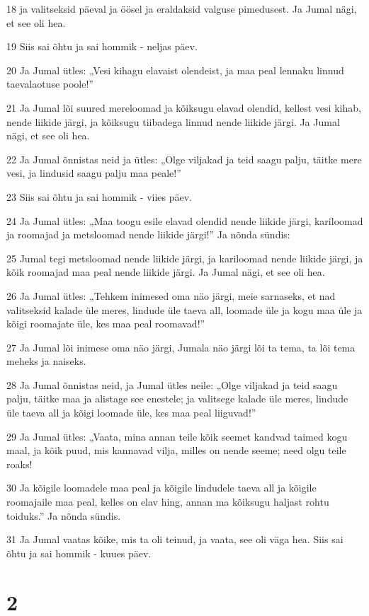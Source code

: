 \par 18 ja valitseksid päeval ja öösel ja eraldaksid valguse pimedusest. Ja Jumal nägi, et see oli hea.
\par 19 Siis sai õhtu ja sai hommik - neljas päev.
\par 20 Ja Jumal ütles: „Vesi kihagu elavaist olendeist, ja maa peal lennaku linnud taevalaotuse poole!”
\par 21 Ja Jumal lõi suured mereloomad ja kõiksugu elavad olendid, kellest vesi kihab, nende liikide järgi, ja kõiksugu tiibadega linnud nende liikide järgi. Ja Jumal nägi, et see oli hea.
\par 22 Ja Jumal õnnistas neid ja ütles: „Olge viljakad ja teid saagu palju, täitke mere vesi, ja lindusid saagu palju maa peale!”
\par 23 Siis sai õhtu ja sai hommik - viies päev.
\par 24 Ja Jumal ütles: „Maa toogu esile elavad olendid nende liikide järgi, kariloomad ja roomajad ja metsloomad nende liikide järgi!” Ja nõnda sündis:
\par 25 Jumal tegi metsloomad nende liikide järgi, ja kariloomad nende liikide järgi, ja kõik roomajad maa peal nende liikide järgi. Ja Jumal nägi, et see oli hea.
\par 26 Ja Jumal ütles: „Tehkem inimesed oma näo järgi, meie sarnaseks, et nad valitseksid kalade üle meres, lindude üle taeva all, loomade üle ja kogu maa üle ja kõigi roomajate üle, kes maa peal roomavad!”
\par 27 Ja Jumal lõi inimese oma näo järgi, Jumala näo järgi lõi ta tema, ta lõi tema meheks ja naiseks.
\par 28 Ja Jumal õnnistas neid, ja Jumal ütles neile: „Olge viljakad ja teid saagu palju, täitke maa ja alistage see enestele; ja valitsege kalade üle meres, lindude üle taeva all ja kõigi loomade üle, kes maa peal liiguvad!”
\par 29 Ja Jumal ütles: „Vaata, mina annan teile kõik seemet kandvad taimed kogu maal, ja kõik puud, mis kannavad vilja, milles on nende seeme; need olgu teile roaks!
\par 30 Ja kõigile loomadele maa peal ja kõigile lindudele taeva all ja kõigile roomajaile maa peal, kelles on elav hing, annan ma kõiksugu haljast rohtu toiduks.” Ja nõnda sündis.
\par 31 Ja Jumal vaatas kõike, mis ta oli teinud, ja vaata, see oli väga hea. Siis sai õhtu ja sai hommik - kuues päev.

\chapter{2}

